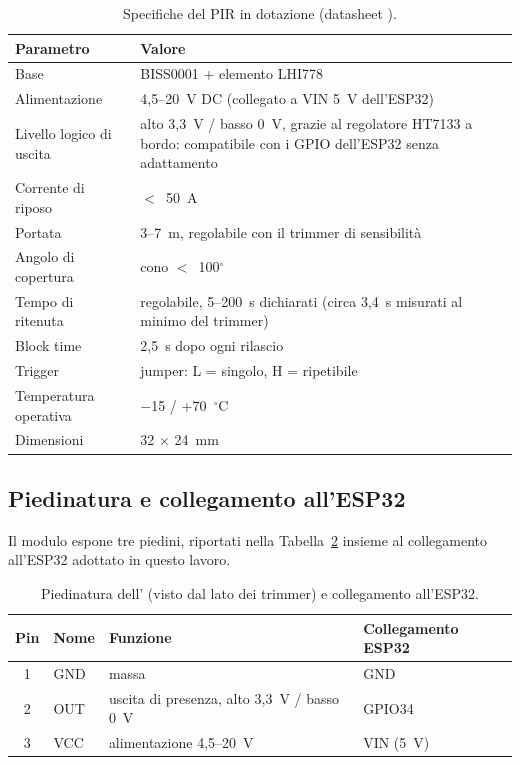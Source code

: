 \begin{table}[!htb]
\centering
\caption{Specifiche del PIR \pir{} in dotazione (datasheet \cite{hcsr501}).}
\label{tab:c3-12}
\small
\begin{tabularx}{\linewidth}{@{}lX@{}}
\toprule
\textbf{Parametro} & \textbf{Valore} \\
\midrule
Base & BISS0001 + elemento LHI778 \\
Alimentazione & 4,5–20~V DC (collegato a VIN 5~V dell'ESP32) \\
Livello logico di uscita & alto 3,3~V / basso 0~V, grazie al regolatore HT7133 a bordo: compatibile con i GPIO dell'ESP32 senza adattamento \\
Corrente di riposo & \(<\)~50~\textmu{}A \\
Portata & 3–7~m, regolabile con il trimmer di sensibilità \\
Angolo di copertura & cono \(<\)~100\(^\circ\) \\
Tempo di ritenuta & regolabile, 5--200~s dichiarati (circa 3,4~s misurati al minimo del trimmer) \\
Block time & 2,5~s dopo ogni rilascio \\
Trigger & jumper: L = singolo, H = ripetibile \\
Temperatura operativa & \(-\)15 / +70~\(^\circ\)C \\
Dimensioni & 32 \(\times\) 24~mm \\
\bottomrule
\end{tabularx}
\end{table}

\subsection{Piedinatura e collegamento all'ESP32}
\label{sec:c3-3-2}

Il modulo espone tre piedini, riportati nella Tabella~\ref{tab:c3-13} insieme al collegamento all'ESP32 adottato in questo lavoro.

\begin{table}[!htb]
\centering
\caption{Piedinatura dell'\pir{} (visto dal lato dei trimmer) e collegamento all'ESP32.}
\label{tab:c3-13}
\small
\begin{tabularx}{\linewidth}{@{}clXl@{}}
\toprule
\textbf{Pin} & \textbf{Nome} & \textbf{Funzione} & \textbf{Collegamento ESP32} \\
\midrule
1 & GND & massa & GND \\
2 & OUT & uscita di presenza, alto 3,3~V / basso 0~V & GPIO34 \\
3 & VCC & alimentazione 4,5–20~V & VIN (5~V) \\
\bottomrule
\end{tabularx}
\end{table}

